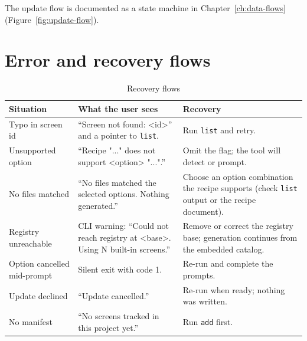 The update flow is documented as a state machine in Chapter~\ref{ch:data-flows}
(Figure~\ref{fig:update-flow}).

\section{Error and recovery flows}

\begin{longtable}{p{4.2cm}p{5cm}p{5.2cm}}
\caption{Recovery flows}\\
\toprule
\textbf{Situation} & \textbf{What the user sees} & \textbf{Recovery} \\
\midrule

Typo in screen id & ``Screen not found: <id>'' and a pointer to \texttt{list}. & Run
\texttt{list} and retry. \\
Unsupported option & ``Recipe "..." does not support <option> "...".'' & Omit the
flag; the tool will detect or prompt. \\
No files matched & ``No files matched the selected options. Nothing generated.'' &
Choose an option combination the recipe supports (check \texttt{list} output or
the recipe document). \\
Registry unreachable & CLI warning: ``Could not reach registry at <base>. Using N
built-in screens.'' & Remove or correct the registry base; generation continues
from the embedded catalog. \\
Option cancelled mid-prompt & Silent exit with code 1. & Re-run and complete the
prompts. \\
Update declined & ``Update cancelled.'' & Re-run when ready; nothing was written. \\
No manifest & ``No screens tracked in this project yet.'' & Run \texttt{add} first. \\
\bottomrule
\end{longtable}
